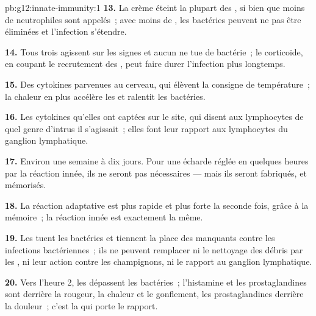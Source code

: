 \begin{solution}{pb:g12:innate-immunity:1}
\textbf{13.} La crème éteint la plupart des , si bien que
moins de neutrophiles sont appelés~; avec moins de , les
bactéries peuvent ne pas être éliminées et l'infection s'étendre.

\textbf{14.} Tous trois agissent sur les signes et aucun ne tue de
bactérie~; le corticoïde, en coupant le recrutement des ,
peut faire durer l'infection plus longtemps.

\textbf{15.} Des cytokines parvenues au cerveau, qui élèvent la
consigne de température~; la chaleur en plus accélère les 
et ralentit les bactéries.

\textbf{16.} Les cytokines qu'elles ont captées sur le site, qui
disent aux lymphocytes de quel genre d'intrus il s'agissait~; elles
font leur rapport aux lymphocytes du ganglion lymphatique.

\textbf{17.} Environ une semaine à dix jours. Pour une écharde réglée
en quelques heures par la réaction innée, ils ne seront pas
nécessaires --- mais ils seront fabriqués, et mémorisés.

\textbf{18.} La réaction adaptative est plus rapide et plus forte la
seconde fois, grâce à la mémoire~; la réaction innée est exactement la
même.

\textbf{19.} Les  tuent les bactéries et tiennent la
place des  manquants contre les infections bactériennes~;
ils ne peuvent remplacer ni le nettoyage des débris par les
, ni leur action contre les champignons, ni le rapport au
ganglion lymphatique.

\textbf{20.} Vers l'heure 2, les  dépassent les bactéries~;
l'histamine et les prostaglandines sont derrière la rougeur, la
chaleur et le gonflement, les prostaglandines derrière la douleur~;
c'est la  qui porte le rapport.
\end{solution}
